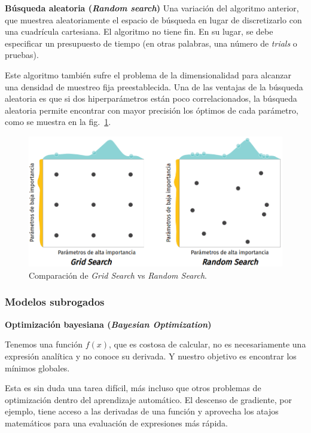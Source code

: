 \documentclass[a4paper,12pt]{article}
\begin{document}
\textbf{Búsqueda aleatoria (\textit{Random search})}
Una variación del algoritmo anterior, que muestrea aleatoriamente el espacio de búsqueda en lugar de discretizarlo con una cuadrícula cartesiana. El algoritmo no tiene fin. En su lugar, se debe especificar un presupuesto de tiempo (en otras palabras, una número de \textit{trials} o pruebas). 

Este algoritmo también sufre el problema de la dimensionalidad para alcanzar una densidad de muestreo fija preestablecida. Una de las ventajas de la búsqueda aleatoria es que si dos hiperparámetros están poco correlacionados, la búsqueda aleatoria permite encontrar con mayor precisión los óptimos de cada parámetro, como se muestra en la fig.~\ref{fig:grid_vs_search}. 

\begin{figure}[H]
	\begin{center}
		\includegraphics[width=1\textwidth]{grid_vs_search_v4.png}
		\caption{Comparación de \textit{Grid Search} vs \textit{Random Search}.}
		\label{fig:grid_vs_search}
	\end{center}
\end{figure}

\subsubsection{Modelos subrogados}

\textbf{Optimización bayesiana (\textit{Bayesian Optimization})} 

Tenemos una función $f(x)$, que es costosa de calcular, no es necesariamente una expresión analítica y no conoce su derivada. Y nuestro objetivo es encontrar los mínimos globales. \citep{Ye2020Oct}

Esta es sin duda una tarea difícil, más incluso que otros problemas de optimización dentro del aprendizaje automático. El descenso de gradiente, por ejemplo, tiene acceso a las derivadas de una función y aprovecha los atajos matemáticos para una evaluación de expresiones más rápida.
\end{document}
